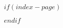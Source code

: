 $if(index-page)$

\begingroup
\ABNTEXfontereduzida
\renewcommand{\baselinestretch}{1}
\setlength{\parindent}{0pt}
\setlength{\parskip}{\tinyskipamount}
\setlength{\afterchapskip}{\hugeskipamount}
\printindex
\endgroup
$endif$

